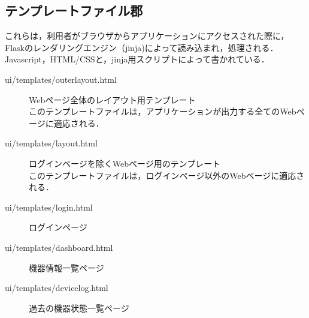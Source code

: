 \subsection*{テンプレートファイル郡}
これらは，利用者がブラウザからアプリケーションにアクセスされた際に，Flaskのレンダリングエンジン（jinja)によって読み込まれ，処理される．
Javascript，HTML/CSSと，jinja用スクリプトによって書かれている．
\begin{description}
\item[ui/templates/outerlayout.html] Webページ全体のレイアウト用テンプレート\\
	このテンプレートファイルは，アプリケーションが出力する全てのWebページに適応される．\\
	
\item[ui/templates/layout.html] ログインページを除くWebページ用のテンプレート\\
	このテンプレートファイルは，ログインページ以外のWebページに適応される．\\
	
\item[ui/templates/login.html] ログインページ\\
	
\item[ui/templates/dashboard.html] 機器情報一覧ページ\\
	
\item[ui/templates/devicelog.html] 過去の機器状態一覧ページ\\
	
\end{description}
